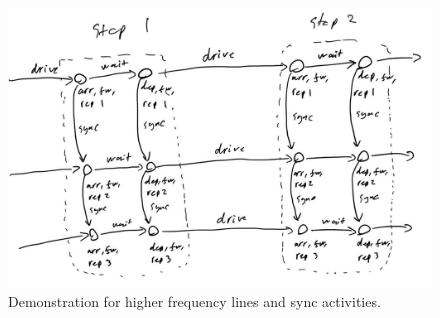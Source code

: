 \documentclass[english, 12pt, a4paper, sci, utf8, a-2b, online]{aaltothesis}
\begin{document}
\begin{figure}
    \centering
    \includegraphics[width=1.0\textwidth]{figures/sync-demo.jpg}
    \caption{Demonstration for higher frequency lines and sync activities.}
    \label{fig:sync-demo}
\end{figure}






\end{document}
